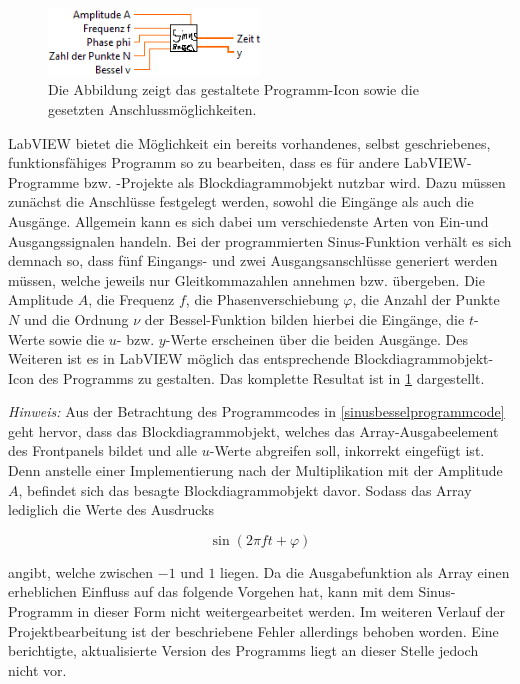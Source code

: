 \documentclass[
a4paper,
12pt,
pagesize,
ngerman
]{scrartcl}
\begin{document}
	\begin{figure}[H]
		\centering
		\includegraphics[width=0.5\textwidth]{EIRE2018Dateien/Tag1/sinusbessel-bilder/SinusBesselc} %
		\caption{Die Abbildung zeigt das gestaltete Programm-Icon sowie die gesetzten Anschlussmöglichkeiten.}
		\label{sinusbesselicon}
	\end{figure}
	
	\noindent LabVIEW bietet die Möglichkeit ein bereits vorhandenes, selbst geschriebenes, funktionsfähiges Programm so zu bearbeiten, dass es für andere LabVIEW-Programme bzw. -Projekte als Blockdiagrammobjekt nutzbar wird. Dazu müssen zunächst die Anschlüsse festgelegt werden, sowohl die Eingänge als auch die Ausgänge. Allgemein kann es sich dabei um verschiedenste Arten von Ein-und Ausgangssignalen handeln. Bei der programmierten Sinus-Funktion verhält es sich demnach so, dass fünf Eingangs- und zwei Ausgangsanschlüsse generiert werden müssen, welche jeweils nur Gleitkommazahlen annehmen bzw. übergeben. Die Amplitude $A$, die Frequenz $f$, die Phasenverschiebung $\varphi$, die Anzahl der Punkte $N$ und die Ordnung $\nu$ der Bessel-Funktion bilden hierbei die Eingänge, die $t$-Werte sowie die $u$- bzw. $y$-Werte erscheinen über die beiden Ausgänge. Des Weiteren ist es in LabVIEW möglich das entsprechende Blockdiagrammobjekt-Icon des Programms zu gestalten. Das komplette Resultat ist in \cref{sinusbesselicon} dargestellt.
	
	\emph{Hinweis:} Aus der Betrachtung des Programmcodes in \cref{sinusbesselprogrammcode} geht hervor, dass das Blockdiagrammobjekt, welches das Array-Ausgabeelement des Frontpanels bildet und alle $u$-Werte abgreifen soll, inkorrekt eingefügt ist. Denn anstelle einer Implementierung nach der Multiplikation mit der Amplitude $A$, befindet sich das besagte Blockdiagrammobjekt davor. Sodass das Array lediglich die Werte des Ausdrucks
	
	\begin{equation}
	\sin(2\pi f t + \varphi)
	\end{equation}
	
	\noindent angibt, welche zwischen $-1$ und $1$ liegen. Da die Ausgabefunktion als Array einen erheblichen Einfluss auf das folgende Vorgehen hat, kann mit dem Sinus-Programm in dieser Form nicht weitergearbeitet werden. Im weiteren Verlauf der Projektbearbeitung ist der beschriebene Fehler allerdings behoben worden. Eine berichtigte, aktualisierte Version des Programms liegt an dieser Stelle jedoch nicht vor.
	\label{sinus_amp_fehler}
	
\end{document}
